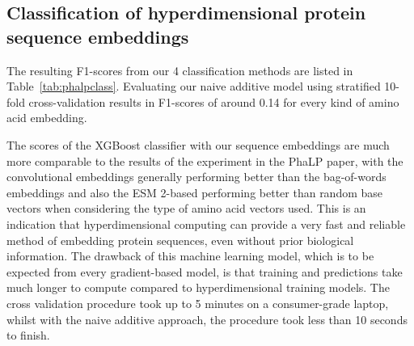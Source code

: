 \subsection*{Classification of hyperdimensional protein sequence embeddings}
The resulting F1-scores from our 4 classification methods are listed in Table~\ref{tab:phalpclass}. Evaluating our naive additive model using stratified 10-fold cross-validation results in F1-scores of around 0.14 for every kind of amino acid embedding.

\begin{table}[h]
    \caption{\label{tab:phalpclass}Results of type classifications using the principal classification technique of hyperdimensional computing, an XGBoost classifier and OnlineHD implementations with several kinds of embeddings. Note that the OnlineHD-based models were developed using real-valued embeddings.}
\end{table}

The scores of the XGBoost classifier with our sequence embeddings are much more comparable to the results of the experiment in the PhaLP paper, with the convolutional embeddings generally performing better than the bag-of-words embeddings and also the ESM 2-based performing better than random base vectors when considering the type of amino acid vectors used. This is an indication that hyperdimensional computing can provide a very fast and reliable method of embedding protein sequences, even without prior biological information. The drawback of this machine learning model, which is to be expected from every gradient-based model, is that training and predictions take much longer to compute compared to hyperdimensional training models. The cross validation procedure took up to 5 minutes on a consumer-grade laptop, whilst with the naive additive approach, the procedure took less than 10 seconds to finish.

